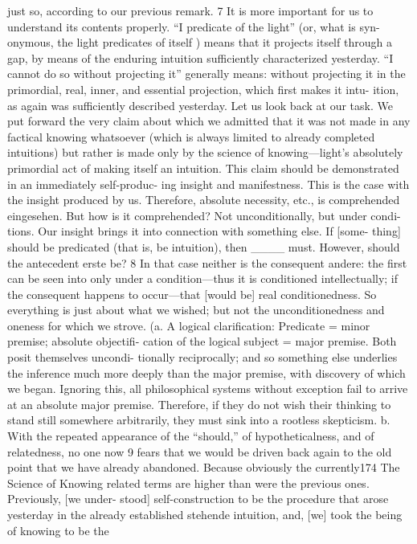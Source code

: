 just so, according to our previous remark. 7 It is more important for us to
understand its contents properly. “I predicate of the light” (or, what is syn-
onymous, the light predicates of itself ) means that it projects itself through a
gap, by means of the enduring intuition sufficiently characterized yesterday. “I
cannot do so without projecting it” generally means: without projecting it in
the primordial, real, inner, and essential projection, which first makes it intu-
ition, as again was sufficiently described yesterday.
Let us look back at our task. We put forward the very claim about which
we admitted that it was not made in any factical knowing whatsoever (which
is always limited to already completed intuitions) but rather is made only by
the science of knowing—light’s absolutely primordial act of making itself an
intuition. This claim should be demonstrated in an immediately self-produc-
ing insight and manifestness. This is the case with the insight produced by us.
Therefore, absolute necessity, etc., is comprehended {eingesehen}.
But how is it comprehended? Not unconditionally, but under condi-
tions. Our insight brings it into connection with something else. If [some-
thing] should be predicated (that is, be intuition), then ____ must. However,
should the antecedent {erste} be? 8
In that case neither is the consequent {andere}: the first can be seen into
only under a condition—thus it is conditioned intellectually; if the consequent
happens to occur—that [would be] real conditionedness. So everything is just
about what we wished; but not the unconditionedness and oneness for which
we strove.
(a. A logical clarification: Predicate = minor premise; absolute objectifi-
cation of the logical subject = major premise. Both posit themselves uncondi-
tionally reciprocally; and so something else underlies the inference much more
deeply than the major premise, with discovery of which we began. Ignoring
this, all philosophical systems without exception fail to arrive at an absolute
major premise. Therefore, if they do not wish their thinking to stand still
somewhere arbitrarily, they must sink into a rootless skepticism.
b. With the repeated appearance of the “should,” of hypotheticalness, and
of relatedness, no one now 9 fears that we would be driven back again to the
old point that we have already abandoned. Because obviously the currently174
The Science of Knowing
related terms are higher than were the previous ones. Previously, [we under-
stood] self-construction to be the procedure that arose yesterday in the already
established {stehende} intuition, and, [we] took the being of knowing to be the
